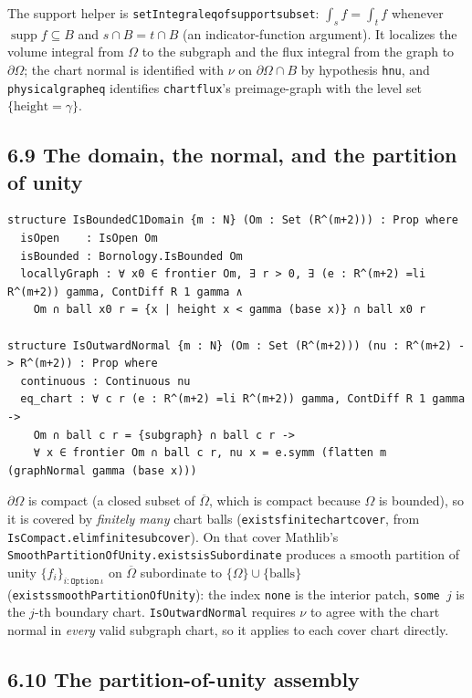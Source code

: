 ﻿\documentclass[12pt, a4paper]{article}
\renewcommand{\_}{\origunderscore\allowbreak}
\theoremstyle{definition}
\theoremstyle{plain}
\begin{document}
The support helper is \texttt{setIntegral\_eq\_of\_support\_subset}: $\int_s f=\int_t f$ whenever
$\operatorname{supp}f\subseteq B$ and $s\cap B=t\cap B$ (an indicator-function argument).  It localizes
the volume integral from $\Omega$ to the subgraph and the flux integral from the graph to
$\partial\Omega$; the chart normal is identified with $\nu$ on $\partial\Omega\cap B$ by hypothesis
\texttt{hnu}, and \texttt{physical\_graph\_eq} identifies \texttt{chart\_flux}'s preimage-graph with
the level set $\{\text{height}=\gamma\}$.

\subsection{6.9 The domain, the normal, and the partition of unity}

\begin{lstlisting}[caption={Bounded C1 domain and outward normal}]
structure IsBoundedC1Domain {m : N} (Om : Set (R^(m+2))) : Prop where
  isOpen    : IsOpen Om
  isBounded : Bornology.IsBounded Om
  locallyGraph : ∀ x0 ∈ frontier Om, ∃ r > 0, ∃ (e : R^(m+2) =li R^(m+2)) gamma, ContDiff R 1 gamma ∧
    Om ∩ ball x0 r = {x | height x < gamma (base x)} ∩ ball x0 r

structure IsOutwardNormal {m : N} (Om : Set (R^(m+2))) (nu : R^(m+2) -> R^(m+2)) : Prop where
  continuous : Continuous nu
  eq_chart : ∀ c r (e : R^(m+2) =li R^(m+2)) gamma, ContDiff R 1 gamma ->
    Om ∩ ball c r = {subgraph} ∩ ball c r ->
    ∀ x ∈ frontier Om ∩ ball c r, nu x = e.symm (flatten m (graphNormal gamma (base x)))
\end{lstlisting}

$\partial\Omega$ is compact (a closed subset of $\overline\Omega$, which is compact because $\Omega$
is bounded), so it is covered by \emph{finitely many} chart balls
(\texttt{exists\_finite\_chart\_cover}, from \texttt{IsCompact.elim\_finite\_subcover}).  On that
cover Mathlib's \texttt{SmoothPartitionOfUnity.exists\_isSubordinate} produces a smooth partition of
unity $\{f_i\}_{i:\mathtt{Option}\,\iota}$ on $\overline\Omega$ subordinate to
$\{\Omega\}\cup\{\text{balls}\}$ (\texttt{exists\_smoothPartitionOfUnity}): the index \texttt{none}
is the interior patch, \texttt{some }$j$ is the $j$-th boundary chart.  \texttt{IsOutwardNormal}
requires $\nu$ to agree with the chart normal in \emph{every} valid subgraph chart, so it applies to
each cover chart directly.

\subsection{6.10 The partition-of-unity assembly}
\end{document}
